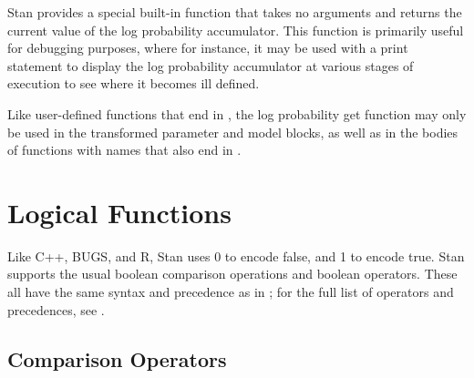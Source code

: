 Stan provides a special built-in function  that takes no
arguments and returns the current value of the log probability
accumulator.  This function is primarily useful for debugging
purposes, where for instance, it may be used with a print statement to
display the log probability accumulator at various stages of execution
to see where it becomes ill defined.

\begin{description}
\end{description}

Like user-defined functions that end in , the log
probability get function may only be used in the transformed parameter
and model blocks, as well as in the bodies of functions with names
that also end in .


\section{Logical Functions}

Like C++, BUGS, and R, Stan uses 0 to encode false, and 1 to encode
true.  Stan supports the usual boolean comparison operations and
boolean operators.  These all have the same syntax and precedence as
in \Cpp; for the full list of operators and precedences, see
.  


\subsection{Comparison Operators}

